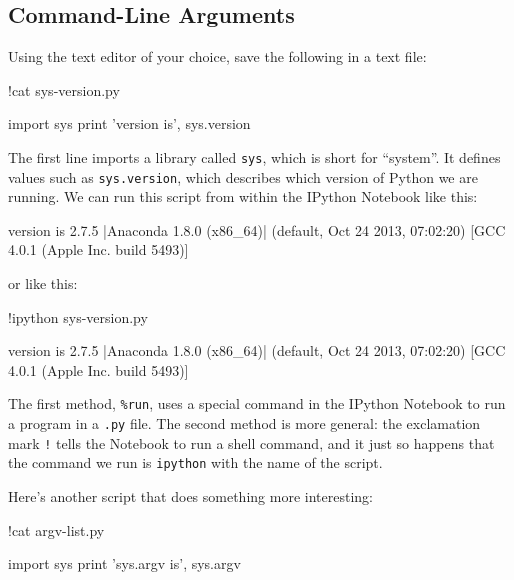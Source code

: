\subsection{Command-Line Arguments}

Using the text editor of your choice, save the following in a text file:

\begin{VerbIn}
!cat sys-version.py
\end{VerbIn}

\begin{VerbIn}
import sys
print 'version is', sys.version
\end{VerbIn}

The first line imports a library called \texttt{sys}, which is short for
``system''. It defines values such as \texttt{sys.version}, which
describes which version of Python we are running. We can run this script
from within the IPython Notebook like this:

\begin{VerbIn}
\end{VerbIn}

\begin{VerbOut}
version is 2.7.5 |Anaconda 1.8.0 (x86_64)| (default, Oct 24 2013, 07:02:20)
[GCC 4.0.1 (Apple Inc. build 5493)]
\end{VerbOut}

or like this:

\begin{VerbIn}
!ipython sys-version.py
\end{VerbIn}

\begin{VerbOut}
version is 2.7.5 |Anaconda 1.8.0 (x86_64)| (default, Oct 24 2013, 07:02:20)
[GCC 4.0.1 (Apple Inc. build 5493)]
\end{VerbOut}

The first method, \texttt{\%run}, uses a special command in the IPython
Notebook to run a program in a \texttt{.py} file. The second method is
more general: the exclamation mark \texttt{!} tells the Notebook to run
a shell command, and it just so happens that the command we run is
\texttt{ipython} with the name of the script.

Here's another script that does something more interesting:

\begin{VerbIn}
!cat argv-list.py
\end{VerbIn}

\begin{VerbOut}
import sys
print 'sys.argv is', sys.argv
\end{VerbOut}

